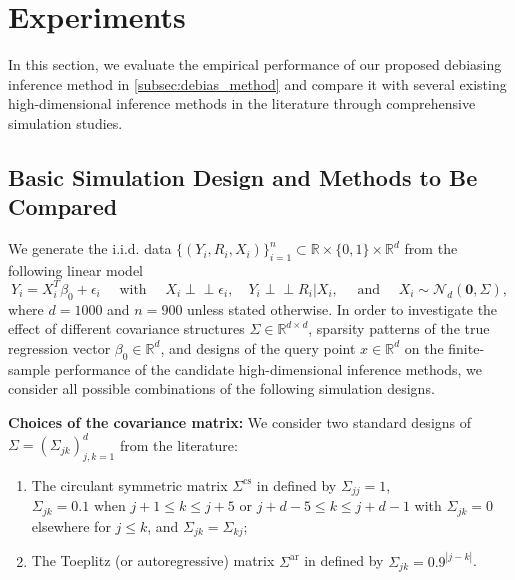 \documentclass[ejsv2,noshowframe]{imsart}
\theoremstyle{plain}
\theoremstyle{definition}
\theoremstyle{remark}
\newcommand{\ind}{{\perp\!\!\!\perp}}
\begin{document}
\section{Experiments}
\label{sec:experiments}

In this section, we evaluate the empirical performance of our proposed debiasing inference method in \autoref{subsec:debias_method} and compare it with several existing high-dimensional inference methods in the literature through comprehensive simulation studies. 

\subsection{Basic Simulation Design and Methods to Be Compared}
\label{subsec:sim_design}

We generate the i.i.d. data $\{(Y_i,R_i,X_i)\}_{i=1}^n \subset \mathbb{R}\times \{0,1\} \times\mathbb{R}^d$ from the following linear model 
\begin{equation}
	\label{sim_setting}
	Y_i=X_i^T \beta_0 + \epsilon_i \quad \text{ with } \quad X_i\ind \epsilon_i, \quad Y_i\ind R_i|X_i, \quad \text{ and } \quad X_i \sim \mathcal{N}_d(\bm{0},\Sigma),
\end{equation}
where $d=1000$ and $n=900$ unless stated otherwise. In order to investigate the effect of different covariance structures $\Sigma\in \mathbb{R}^{d\times d}$, sparsity patterns of the true regression vector $\beta_0\in \mathbb{R}^d$, and designs of the query point $x \in \mathbb{R}^d$ on the finite-sample performance of the candidate high-dimensional inference methods, we consider all possible combinations of the following simulation designs.

{\bf Choices of the covariance matrix:} We consider two standard designs of $\Sigma=\left(\Sigma_{jk}\right)_{j,k=1}^d$ from the literature:
\begin{enumerate}[label=(\roman*)]
	\item The circulant symmetric matrix $\Sigma^{\mathrm{cs}}$ in \cite{javanmard2014confidence} defined by $\Sigma_{jj}=1$, $\Sigma_{jk}=0.1 \text{ when } j+1\leq k\leq j+5 \text{ or } j+d-5\leq k \leq j+d-1$ with $\Sigma_{jk}=0$ elsewhere for $j\leq k$, and $\Sigma_{jk}=\Sigma_{kj}$;
	
	\item The Toeplitz (or autoregressive) matrix $\Sigma^{\mathrm{ar}}$ in \cite{van2014asymptotically} defined by $\Sigma_{jk}=0.9^{|j-k|}$.
\end{enumerate}
\end{document}
